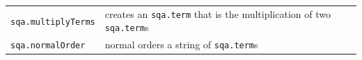\documentclass{article}
\newcommand  \var[1]       {\texttt{#1}}
\begin{document}
\noindent
\begin{tabularx}{\linewidth}{lX}
  \var{sqa.multiplyTerms}               & creates an \var{sqa.term} that is the multiplication of two \var{sqa.term}s\\
  \var{sqa.normalOrder}                 & normal orders a string of \var{sqa.term}s \\
\end{tabularx}

%
\end{document}
